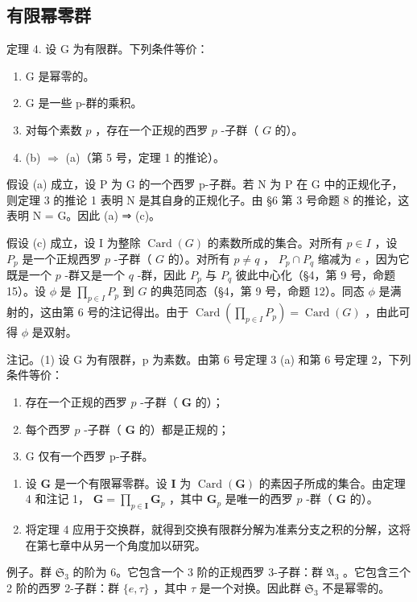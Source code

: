 \subsection{有限幂零群}

定理 4. 设 G 为有限群。下列条件等价：

\begin{enumerate}
\def\labelenumi{(\alph{enumi})}
\item
  G 是幂零的。
\item
  G 是一些 p-群的乘积。
\item
  对每个素数 \(p\) ，存在一个正规的西罗 \(p\) -子群（ \(G\) 的）。
\item
  (b) \(\Rightarrow\) (a)（第 5 号，定理 1 的推论）。
\end{enumerate}

假设 (a) 成立，设 P 为 G 的一个西罗 p-子群。若 N 为 P 在 G 中的正规化子，则定理 3 的推论 1 表明 N 是其自身的正规化子。由 §6 第 3 号命题 8 的推论，这表明 N = G。因此 (a) ⇒ (c)。

假设 (c) 成立，设 I 为整除 \(\operatorname{Card}(G)\) 的素数所成的集合。对所有 \(p \in I\) ，设 \(P_p\) 是一个正规西罗 \(p\) -子群（ \(G\) 的）。对所有 \(p \neq q\) ， \(P_p \cap P_q\) 缩减为 \(e\) ，因为它既是一个 \(p\) -群又是一个 \(q\) -群，因此 \(P_p\) 与 \(P_q\) 彼此中心化（§4，第 9 号，命题 15）。设 \(\phi\) 是 \(\prod_{p \in I} P_p\) 到 \(G\) 的典范同态（§4，第 9 号，命题 12）。同态 \(\phi\) 是满射的，这由第 6 号的注记得出。由于 \(\operatorname{Card}\left(\prod_{p \in I} P_p\right) = \operatorname{Card}(G)\) ，由此可得 \(\phi\) 是双射。

注记。(1) 设 G 为有限群，p 为素数。由第 6 号定理 3 (a) 和第 6 号定理 2，下列条件等价：

\begin{enumerate}
\def\labelenumi{(\roman{enumi})}
\item
  存在一个正规的西罗 \(p\) -子群（ \(\mathbf{G}\) 的）；
\item
  每个西罗 \(p\) -子群（ \(\mathbf{G}\) 的）都是正规的；
\item
  G 仅有一个西罗 p-子群。
\end{enumerate}

\begin{enumerate}
\def\labelenumi{(\arabic{enumi})}
\setcounter{enumi}{1}
\item
  设 \(\mathbf{G}\) 是一个有限幂零群。设 \(\mathbf{I}\) 为 \(\operatorname{Card}(\mathbf{G})\) 的素因子所成的集合。由定理 4 和注记 1， \(\mathbf{G} = \prod_{p \in \mathbf{I}} \mathbf{G}_p\) ，其中 \(\mathbf{G}_p\) 是唯一的西罗 \(p\) -群（ \(\mathbf{G}\) 的）。
\item
  将定理 4 应用于交换群，就得到交换有限群分解为准素分支之积的分解，这将在第七章中从另一个角度加以研究。
\end{enumerate}

例子。群 \(\mathfrak{S}_3\) 的阶为 6。它包含一个 3 阶的正规西罗 3-子群：群 \(\mathfrak{A}_3\) 。它包含三个 2 阶的西罗 2-子群：群 \(\{e, \tau\}\) ，其中 \(\tau\) 是一个对换。因此群 \(\mathfrak{S}_3\) 不是幂零的。

